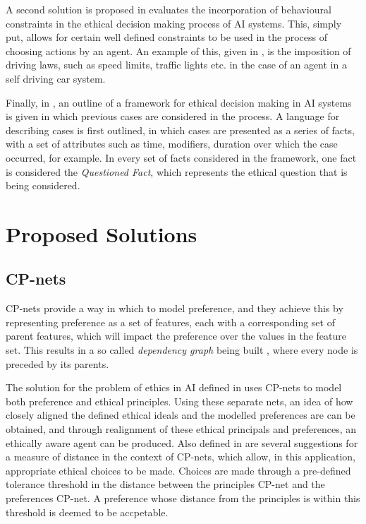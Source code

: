 \documentclass{svproc}
\begin{document}
\par
A second solution is proposed in \cite{balakrishnan} evaluates the incorporation of behavioural constraints in the ethical decision making process of AI systems. This, simply put, allows for certain well defined constraints to be used in the process of choosing actions by an agent. An example of this, given in \cite{kjoelen1995performance}, is the imposition of driving laws, such as speed limits, traffic lights etc. in the case of an agent in a self driving car system.
\par
Finally, in \cite{sirocco}, an outline of a framework for ethical decision making in AI systems is given in which previous cases are considered in the process. A language for describing cases is first outlined, in which cases are presented as a series of facts, with a set of attributes such as time, modifiers, duration over which the case occurred, for example. In every set of facts considered in the framework, one fact is considered the \textit{Questioned Fact}, which represents the ethical question that is being considered.

\section{Proposed Solutions}
\subsection{CP-nets}
\par
CP-nets provide a way in which to model preference, and they achieve this by representing preference as a set of features, each with a corresponding set of parent features, which will impact the preference over the values in the feature set. This results in a so called \textit{dependency graph} being built \cite{loreggia}, where every node is preceded by its parents.
\par
The solution for the problem of ethics in AI defined in \cite{loreggia} uses CP-nets to model both preference and ethical principles. Using these separate nets, an idea of how closely aligned the defined ethical ideals and the modelled preferences are can be obtained, and through realignment of these ethical principals and preferences, an ethically aware agent can be produced. Also defined in \cite{loreggia} are several suggestions for a measure of distance in the context of CP-nets, which allow, in this application, appropriate ethical choices to be made. Choices are made through a pre-defined tolerance threshold in the distance between the principles CP-net and the preferences CP-net. A preference whose distance from the principles is within this threshold is deemed to be accpetable.
\end{document}
